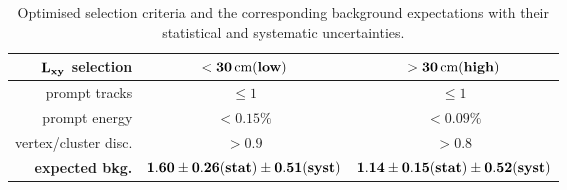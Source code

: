 \begin{table}[htbp]
\centering
\begin{tabular}{r|c|c}
$\bf L_{xy}$ \bf selection &\bf  $\bf <30\,\text{cm} (low)$ & \bf  $\bf >30\,\text{cm} (high)$ \\
\hline
prompt tracks & $\leq1$ & $\leq1$ \\
prompt energy & $<0.15\%$ & $<0.09\%$ \\
vertex/cluster disc. & $>0.9$ & $>0.8$  \\
\hline
\bf expected bkg. & $\bf 1.60\pm0.26(stat)\pm0.51(syst)$ & $\bf 1.14\pm0.15(stat)\pm0.52(syst)$ \\
\end{tabular}
\caption{Optimised selection criteria and the corresponding background expectations with their statistical and systematic uncertainties.\label{tab:background}}
\end{table}

